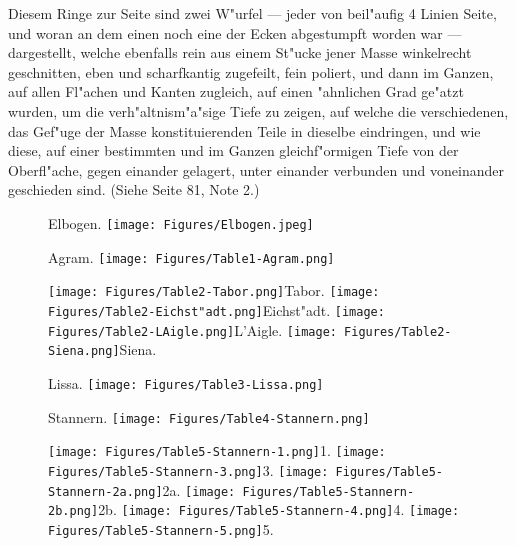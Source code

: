 \documentclass[a4paper, 11pt, oneside, german]{article}
\begin{document}
Diesem Ringe zur Seite sind zwei W"urfel --- jeder von beil"aufig 4 Linien Seite, und woran an dem einen noch eine der Ecken abgestumpft worden war --- dargestellt, welche ebenfalls rein aus einem St"ucke jener Masse winkelrecht geschnitten, eben und scharfkantig zugefeilt, fein poliert, und dann im Ganzen, auf allen Fl"achen und Kanten zugleich, auf einen "ahnlichen Grad ge"atzt wurden, um die verh"altnism"a"sige Tiefe zu zeigen, auf welche die verschiedenen, das Gef"uge der Masse konstituierenden Teile in dieselbe eindringen, und wie diese, auf einer bestimmten und im Ganzen gleichf"ormigen Tiefe von der Oberfl"ache, gegen einander gelagert, unter einander verbunden und voneinander geschieden sind. (Siehe Seite 81, Note 2.)
\clearpage
\setlength\intextsep{0pt}
\pagestyle{fancy}
\fancyhf{}
\cfoot{\thepage}
\begin{figure}[p]
\tiny Elbogen.
\texttt{[image: Figures/Elbogen.jpeg]}
\end{figure}
\clearpage
{}
\cfoot{\thepage}
\begin{figure}[p]
\tiny Agram.
\texttt{[image: Figures/Table1-Agram.png]}
\end{figure}
\clearpage
{}
\cfoot{\thepage}
\begin{figure}[p]
\texttt{[image: Figures/Table2-Tabor.png]}\tiny Tabor.
\texttt{[image: Figures/Table2-Eichst"adt.png]}\tiny Eichst"adt.
\texttt{[image: Figures/Table2-LAigle.png]}\tiny L'Aigle.
\texttt{[image: Figures/Table2-Siena.png]}\tiny Siena.
\end{figure}
\clearpage
{}
\cfoot{\thepage}
\begin{figure}[p]
\tiny Lissa.
\texttt{[image: Figures/Table3-Lissa.png]}
\end{figure}
\clearpage
{}
\cfoot{\thepage}
\begin{figure}[p]
\tiny Stannern.
\texttt{[image: Figures/Table4-Stannern.png]}
\end{figure}
\clearpage
{}
\cfoot{\thepage}
\begin{figure}[p]
\texttt{[image: Figures/Table5-Stannern-1.png]}\tiny 1.
\texttt{[image: Figures/Table5-Stannern-3.png]}\tiny 3.
\texttt{[image: Figures/Table5-Stannern-2a.png]}\tiny 2a.
\texttt{[image: Figures/Table5-Stannern-2b.png]}\tiny 2b.
\texttt{[image: Figures/Table5-Stannern-4.png]}\tiny 4.
\texttt{[image: Figures/Table5-Stannern-5.png]}\tiny 5.
\end{figure}
\end{document}
